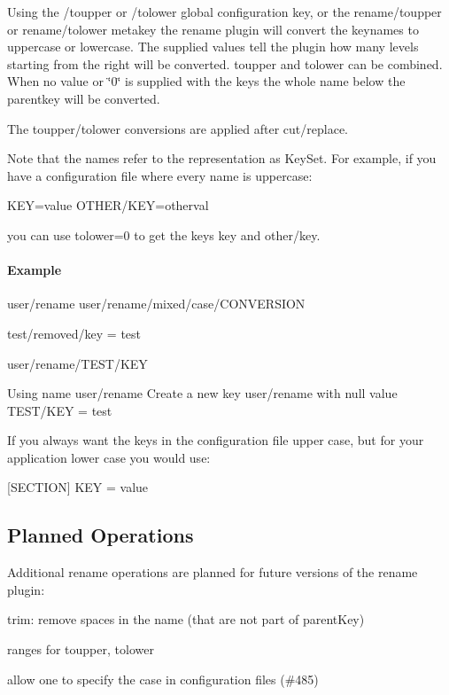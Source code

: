 Using the {\ttfamily /toupper} or {\ttfamily /tolower} global configuration key, or the {\ttfamily rename/toupper} or {\ttfamily rename/tolower} metakey the rename plugin will convert the keynames to uppercase or lowercase. The supplied values tell the plugin how many levels starting from the right will be converted. {\ttfamily toupper} and {\ttfamily tolower} can be combined. When no value or \char`\"{}0\char`\"{} is supplied with the keys the whole name below the parentkey will be converted.

The toupper/tolower conversions are applied after cut/replace.

Note that the names refer to the representation as Key\+Set. For example, if you have a configuration file where every name is uppercase\+: \begin{DoxyVerb}KEY=value
OTHER/KEY=otherval
\end{DoxyVerb}


you can use {\ttfamily tolower=0} to get the keys {\ttfamily key} and {\ttfamily other/key}.

\paragraph*{Example}

\begin{DoxyVerb}%


user/rename
user/rename/mixed/case/CONVERSION

test/removed/key = test

user/rename/TEST/KEY

Using name user/rename
Create a new key user/rename with null value
TEST/KEY = test
\end{DoxyVerb}


If you always want the keys in the configuration file upper case, but for your application lower case you would use\+: \begin{DoxyVerb}%
[SECTION]
KEY = value
\end{DoxyVerb}


\subsection*{Planned Operations}

Additional rename operations are planned for future versions of the rename plugin\+:
\begin{DoxyItemize}
\item trim\+: remove spaces in the name (that are not part of parent\+Key)
\item ranges for toupper, tolower
\item allow one to specify the case in configuration files (\#485) 
\end{DoxyItemize}
